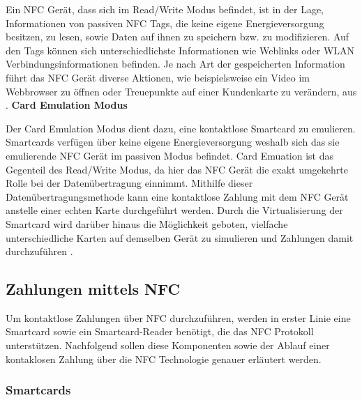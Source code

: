 Ein NFC Gerät, dass sich im Read/Write Modus befindet, ist in der Lage, Informationen von passiven NFC Tags, die keine eigene Energieversorgung besitzen, zu lesen, sowie Daten auf ihnen zu speichern bzw. zu modifizieren. Auf den Tags können sich unterschiedlichste Informationen wie Weblinks oder WLAN Verbindungsinformationen befinden. Je nach Art der gespeicherten Information führt das NFC Gerät diverse Aktionen, wie beispielsweise ein Video im Webbrowser zu öffnen oder Treuepunkte auf einer Kundenkarte zu verändern, aus \cite{Madlmayr2014, nfcHealthMonitoring}. 
\newline
\newline
\textbf{Card Emulation Modus}

Der Card Emulation Modus dient dazu, eine kontaktlose Smartcard zu emulieren. Smartcards verfügen über keine eigene Energieversorgung weshalb sich das sie emulierende NFC Gerät im passiven Modus befindet. Card Emuation ist das Gegenteil des Read/Write Modus, da hier das NFC Gerät die exakt umgekehrte Rolle bei der Datenübertragung einnimmt. Mithilfe dieser Datenübertragungsmethode kann eine kontaktlose Zahlung mit dem NFC Gerät anstelle einer echten Karte durchgeführt werden. Durch die Virtualisierung der Smartcard wird darüber hinaus die Möglichkeit geboten, vielfache unterschiedliche Karten auf demselben Gerät zu simulieren und Zahlungen damit durchzuführen \cite{Madlmayr2014}. 

\subsection{Zahlungen mittels NFC}

Um kontaktlose Zahlungen über NFC durchzuführen, werden in erster Linie eine Smartcard sowie ein Smartcard-Reader benötigt, die das NFC Protokoll unterstützen. Nachfolgend sollen diese Komponenten sowie der Ablauf einer kontaklosen Zahlung über die NFC Technologie genauer erläutert werden. 

\subsubsection{Smartcards}

